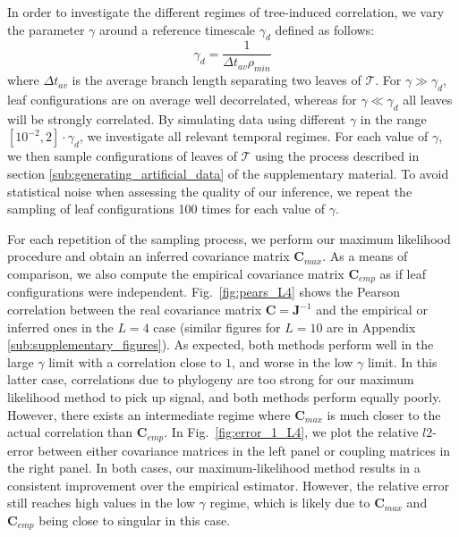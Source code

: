 \documentclass[preprint,amsmath,amssymb,superscriptaddress,showpacs,pre]{revtex4-1}
\begin{document}
In order to investigate the different regimes of tree-induced correlation, we vary the parameter $\gamma$ around a reference timescale $\gamma_d$ defined as follows: 
\begin{equation}
    \gamma_d = \frac{1}{\Delta t_{av}\rho_{min}} 
\end{equation}
where $\Delta t_{av}$ is the average branch length separating two leaves of $\mathcal{T}$. 
For $\gamma \gg \gamma_d$, leaf configurations are on average well decorrelated, whereas for $\gamma \ll \gamma_d$ all leaves will be strongly correlated. 
By simulating data using different $\gamma$ in the range $[10^{-2},2]\cdot\gamma_d$, we investigate all relevant temporal regimes.  
For each value of $\gamma$, we then sample  configurations of leaves of $\mathcal{T}$ using the process described in section \ref{sub:generating_artificial_data} of the supplementary material. 
To avoid statistical noise when assessing the quality of our inference, we repeat the sampling of leaf configurations 100 times for each value of $\gamma$.

For each repetition of the sampling process, we perform our maximum likelihood procedure and obtain an inferred covariance matrix $\bm{C}_{max}$. 
As a means of comparison, we also compute the empirical covariance matrix $\bm{C}_{emp}$ as if leaf configurations were independent. 
Fig.~\ref{fig:pears_L4} shows the Pearson correlation between the real covariance matrix $\bm{C}=\bm{J}^{-1}$ and the empirical or inferred ones in the $L=4$ case (similar figures for $L=10$ are in Appendix \ref{sub:supplementary_figures}). 
As expected, both methods perform well in the large $\gamma$ limit with a correlation close to $1$, and worse in the low $\gamma$ limit. 
In this latter case, correlations due to phylogeny are too strong for our maximum likelihood method to pick up signal, and both methods perform equally poorly. 
However, there exists an intermediate regime where $\bm{C}_{max}$ is much closer to the actual correlation than  $\bm{C}_{emp}$. 
In Fig.~\ref{fig:error_1_L4}, we plot the relative $l2$-error between either covariance matrices in the left panel or coupling matrices in the right panel. 
In both cases, our maximum-likelihood method results in a consistent improvement over the empirical estimator. 
However, the relative error still reaches high values in the low $\gamma$ regime, which is likely due to $\bm{C}_{max}$ and $\bm{C}_{emp}$ being close to singular in this case. 
\end{document}

